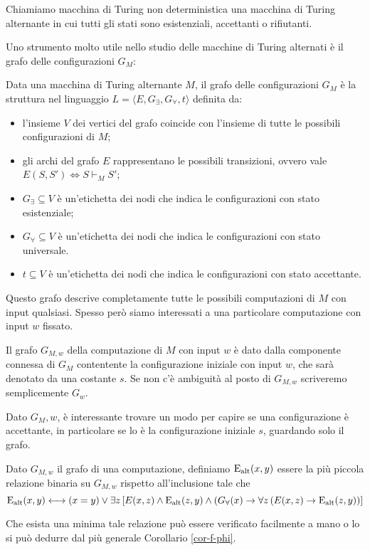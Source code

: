 \begin{definizione}
 Chiamiamo macchina di Turing non deterministica una macchina di Turing alternante
 in cui tutti gli stati sono esistenziali, accettanti o rifiutanti.
\end{definizione}

Uno strumento molto utile nello studio delle macchine di Turing alternati è
il grafo delle configurazioni $G_M$:

\begin{definizione}
 Data una macchina di  Turing alternante $M$, il grafo delle configurazioni $G_M$
 è la struttura nel linguaggio $L=\langle E, G_\exists, G_\forall, t\rangle$
 definita da:
 \begin{itemize}
  \item l'insieme $V$ dei vertici del grafo coincide con l'insieme di tutte le
  possibili configurazioni di $M$;
  \item gli archi del grafo $E$ rappresentano le possibili transizioni, ovvero
  vale $E(S,S') \iff S \vdash_M S'$;
  \item $G_\exists \subseteq V$ è un'etichetta dei nodi che indica le configurazioni
  con stato esistenziale;
  \item $G_\forall \subseteq V$ è un'etichetta dei nodi che indica le configurazioni
  con stato universale.
  \item $t \subseteq V$ è un'etichetta dei nodi che indica le configurazioni
  con stato accettante. 
 \end{itemize}
\end{definizione}
Questo grafo descrive completamente tutte le possibili computazioni di $M$ con
input qualsiasi. Spesso però siamo interessati a una particolare computazione
con input $w$ fissato.
\begin{definizione}
 Il grafo $G_{M,w}$
 della computazione di $M$ con input $w$ è dato dalla
 componente connessa di $G_M$ contentente la configurazione iniziale con input $w$,
 che sarà denotato da una costante $s$. Se non c'è ambiguità al posto di $G_{M,w}$
 scriveremo semplicemente $G_w$.
\end{definizione}
Dato $G_M,w$, è interessante trovare un modo per capire se una configurazione
è accettante, in particolare se lo è la configurazione iniziale $s$, guardando
solo il grafo.
\begin{definizione}
 Dato $G_{M,w}$ il grafo di una computazione, definiamo $\operatorname{E_{alt}}(x,y)$ essere la
 più piccola relazione binaria su $G_{M,w}$ rispetto all'inclusione tale che
 \[
  \operatorname{E_{alt}}(x,y) \longleftrightarrow (x=y) \lor \exists z 
  \left[ E(x,z) \land \operatorname{E_{alt}}(z,y) \land (G_\forall(x) \rightarrow \forall z\left(E(x,z) \rightarrow \operatorname{E_{alt}}(z,y)\right)\right]
 \]
\end{definizione}
 Che esista una minima tale relazione può essere verificato facilmente a mano o
 lo si può dedurre dal più generale Corollario \ref{cor-f-phi}.

